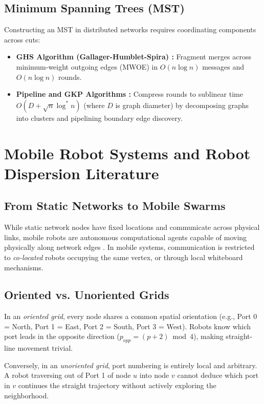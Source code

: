 \documentclass[11pt,a4paper]{report}
\begin{document}
\subsection{Minimum Spanning Trees (MST)}
Constructing an MST in distributed networks requires coordinating components across cuts:
\begin{itemize}
    \item \textbf{GHS Algorithm (Gallager-Humblet-Spira) \cite{ghs1983distributed}:} Fragment merges across minimum-weight outgoing edges (MWOE) in $O(n \log n)$ messages and $O(n \log n)$ rounds.
    \item \textbf{Pipeline and GKP Algorithms \cite{garay1998sublinear, kutten1995fast}:} Compress rounds to sublinear time $O(D + \sqrt{n} \log^* n)$ (where $D$ is graph diameter) by decomposing graphs into clusters and pipelining boundary edge discovery.
\end{itemize}

\section{Mobile Robot Systems and Robot Dispersion Literature}
\subsection{From Static Networks to Mobile Swarms}
While static network nodes have fixed locations and communicate across physical links, mobile robots are autonomous computational agents capable of moving physically along network edges \cite{augustine2018dispersion}. In mobile systems, communication is restricted to \emph{co-located} robots occupying the same vertex, or through local whiteboard mechanisms.

\subsection{Oriented vs. Unoriented Grids}
In an \emph{oriented grid}, every node shares a common spatial orientation (e.g., Port 0 = North, Port 1 = East, Port 2 = South, Port 3 = West). Robots know which port leads in the opposite direction ($p_{opp} = (p + 2) \bmod 4$), making straight-line movement trivial.

Conversely, in an \emph{unoriented grid}, port numbering is entirely local and arbitrary. A robot traversing out of Port 1 of node $u$ into node $v$ cannot deduce which port in $v$ continues the straight trajectory without actively exploring the neighborhood.
\end{document}
